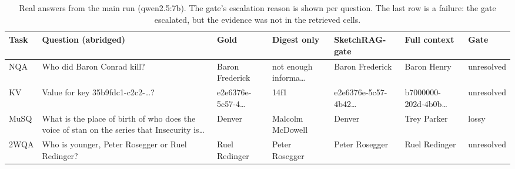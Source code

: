\begin{table}[t]
\centering
\caption{Real answers from the main run (qwen2.5:7b). The gate's escalation reason is shown per question. The last row is a failure: the gate escalated, but the evidence was not in the retrieved cells.}
\label{tab:cases}
\footnotesize
\setlength{\tabcolsep}{3.5pt}
\begin{tabular}{l p{4.0cm} l l l l l}
\toprule
Task & Question (abridged) & Gold & Digest only & SketchRAG-gate & Full context & Gate \\
\midrule
NQA & Who did Baron Conrad kill? &Baron Frederick & not enough informa\ldots & Baron Frederick & Baron Henry & unresolved \\
KV & Value for key 35b9fdc1-c2c2-\ldots? &e2e6376e-5c57-4\ldots & 14f1 & e2e6376e-5c57-4b42\ldots & b7000000-202d-4b0b\ldots & unresolved \\
MuSQ & What is the place of birth of who does the voice of stan on the series that Insecurity is\ldots &Denver & Malcolm McDowell & Denver & Trey Parker & lossy \\
2WQA & Who is younger, Peter Rosegger or Ruel Redinger? &Ruel Redinger & Peter Rosegger & Peter Rosegger & Ruel Redinger & unresolved \\
\bottomrule
\end{tabular}
\end{table}